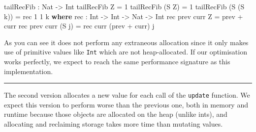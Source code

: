 \documentclass[
]{article}
\newenvironment{Shaded}{}{}
\newcommand{\DataTypeTok}[1]{\textcolor[rgb]{0.56,0.13,0.00}{#1}}
\newcommand{\DecValTok}[1]{\textcolor[rgb]{0.25,0.63,0.44}{#1}}
\newcommand{\KeywordTok}[1]{\textcolor[rgb]{0.00,0.44,0.13}{\textbf{#1}}}
\newcommand{\NormalTok}[1]{#1}
\newcommand{\OperatorTok}[1]{\textcolor[rgb]{0.40,0.40,0.40}{#1}}
\newcommand{\OtherTok}[1]{\textcolor[rgb]{0.00,0.44,0.13}{#1}}
\begin{document}
\begin{Shaded}
\begin{Highlighting}[]
\NormalTok{tailRecFib }\OperatorTok{:} \DataTypeTok{Nat} \OtherTok{{-}\textgreater{}} \DataTypeTok{Int}
\NormalTok{tailRecFib }\DataTypeTok{Z} \OtherTok{=} \DecValTok{1}
\NormalTok{tailRecFib (}\DataTypeTok{S} \DataTypeTok{Z}\NormalTok{) }\OtherTok{=} \DecValTok{1}
\NormalTok{tailRecFib (}\DataTypeTok{S}\NormalTok{ (}\DataTypeTok{S}\NormalTok{ k)) }\OtherTok{=}\NormalTok{ rec }\DecValTok{1} \DecValTok{1}\NormalTok{ k}
  \KeywordTok{where}
\NormalTok{    rec }\OperatorTok{:} \DataTypeTok{Int} \OtherTok{{-}\textgreater{}} \DataTypeTok{Int} \OtherTok{{-}\textgreater{}} \DataTypeTok{Nat} \OtherTok{{-}\textgreater{}} \DataTypeTok{Int}
\NormalTok{    rec prev curr }\DataTypeTok{Z} \OtherTok{=}\NormalTok{ prev }\OperatorTok{+}\NormalTok{ curr}
\NormalTok{    rec prev curr (}\DataTypeTok{S}\NormalTok{ j) }\OtherTok{=}\NormalTok{ rec curr (prev }\OperatorTok{+}\NormalTok{ curr) j}
\end{Highlighting}
\end{Shaded}

As you can see it does not perform any extraneous allocation since it
only makes use of primitive values like \texttt{Int} which are not
heap-allocated. If our optimisation works perfectly, we expect to reach
the same performance signature as this implementation.

\begin{center}\rule{0.5\linewidth}{0.5pt}\end{center}

The second version allocates a new value for each call of the
\texttt{update} function. We expect this version to perform worse than
the previous one, both in memory and runtime because those objects are
allocated on the heap (unlike ints), and allocating and reclaiming
storage takes more time than mutating values.
\end{document}

